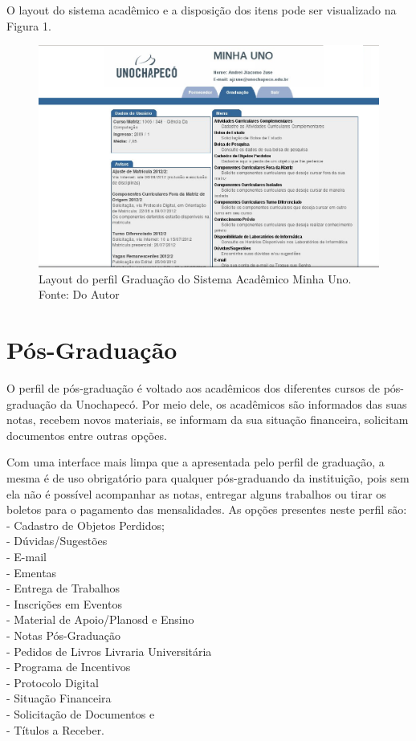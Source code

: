 O layout do sistema acadêmico e a disposição dos itens pode ser visualizado na Figura 1.

\begin{figure}[!htb]
     \centering
     \includegraphics[scale=0.3]{imagens/GraduacaoCorrigida.png}
     \caption[Layout do Sistema - Perfil Graduação]{Layout do perfil Graduação do Sistema Acadêmico Minha Uno. Fonte: Do Autor}
\end{figure}

\newpage
\section{Pós-Graduação}
O perfil de pós-graduação é voltado aos acadêmicos dos diferentes cursos de pós-graduação da Unochapecó. 
Por meio dele, os acadêmicos são informados das  suas notas, recebem novos materiais, 
se informam da sua situação financeira, solicitam documentos entre outras opções.

Com uma interface mais limpa que a apresentada pelo perfil de graduação, a mesma é de uso obrigatório para qualquer 
pós-graduando da instituição, pois sem ela não é possível acompanhar as notas, entregar alguns trabalhos ou 
tirar os boletos para o pagamento das mensalidades. As opções presentes neste perfil são: \\
- Cadastro de Objetos Perdidos; \\
- Dúvidas/Sugestões \\
- E-mail \\
- Ementas \\
- Entrega de Trabalhos \\
- Inscrições em Eventos \\
- Material de Apoio/Planosd e Ensino \\
- Notas Pós-Graduação \\
- Pedidos de Livros Livraria Universitária \\
- Programa de Incentivos \\
- Protocolo Digital \\
- Situação Financeira \\
- Solicitação de Documentos e \\
- Títulos a Receber. \\

